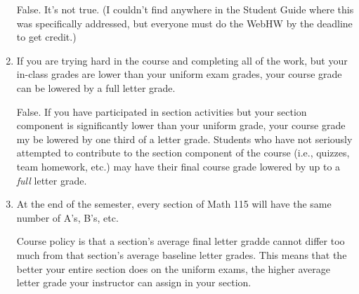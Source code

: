 \documentclass[11pt,letterpaper]{article}
\begin{document}
\begin{enumerate}
\vspace{.5pc}
False.  It's not true.  (I couldn't find anywhere in the Student Guide where this was specifically addressed, but everyone must do the WebHW by the deadline to get credit.)

\item  If you are trying hard in the course and completing all of the work, but your in-class grades are lower than your uniform exam grades, your course grade can be lowered by a full letter grade.

\vspace{.5pc}
False.  If you have participated in section activities but your section component is significantly lower than your uniform grade, your course grade my be lowered by one third of a letter grade.  Students who have not seriously attempted to contribute to the section component of the course (i.e., quizzes, team homework, etc.) may have their final course grade lowered by up to a \emph{full} letter grade.

\item  At the end of the semester, every section of Math 115 will have the same number of A's, B's, etc.

\vspace{.5pc}
Course policy is that a section's average final letter gradde cannot differ too much from that section's average baseline letter grades.  This means that the better your entire section does on the uniform exams, the higher average letter grade your instructor can assign in your section.

\end{enumerate}
\end{document}
